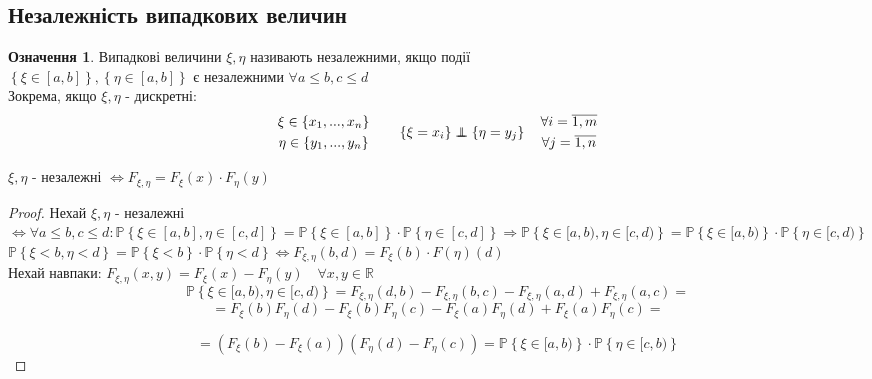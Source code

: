 \documentclass[fontsize=14pt,a4paper]{scrartcl}
\theoremstyle{definition}
\newtheorem*{defo}{Означення}
\theoremstyle{remark}
\theoremstyle{definition}
\theoremstyle{definition}
\newcommand\independent{\protect\mathpalette{\protect\independenT}{\perp}}
\def\independenT#1#2{\mathrel{\rlap{$#1#2$}\mkern2mu{#1#2}}}
\begin{document}
\subsection{Незалежність випадкових величин}
\begin{defo}
	Випадкові величини $\xi, \eta$ називають незалежними, якщо події \\$ \left\lbrace \xi\in [a,b] \right\rbrace, \left\lbrace \eta\in [a,b] \right\rbrace $ є незалежними $ \forall a \leq  b , c\leq d$\\
	Зокрема, якщо $\xi, \eta$ - дискретні:
	$$
	\begin{gathered}
	 \xi \in \left\lbrace x_1, ..., x_n \right\rbrace\\
	 \eta \in \left\lbrace y_1, ..., y_n  \right\rbrace
	\end{gathered} \qquad \left\lbrace \xi = x_i \right\rbrace \independent \left\lbrace \eta = y_j \right\rbrace \quad \begin{gathered}
	 \forall i = \overline{1, m}\\
	 \forall j = \overline{1, n}
	\end{gathered}
	$$

\end{defo}

\pagebreak

\begin{boxteo}
	$\xi, \eta$ - незалежні $\Leftrightarrow F_{\xi, \eta} = F_{\xi}(x) \cdot F_{\eta}(y)$
\end{boxteo}
\begin{proof}
Нехай $\xi, \eta$ - незалежні $\Leftrightarrow \forall a\leq b, c\leq d: \mathbb{P} \left\lbrace  \xi \in [a,b], \eta \in [c,d] \right\rbrace = \mathbb{P} \left\lbrace \xi\in[a,b] \right\rbrace \cdot \mathbb{P} \left\lbrace \eta\in[c,d] \right\rbrace \Rightarrow \mathbb{P} \left\lbrace  \xi\in [a,b), \eta \in [c,d) \right\rbrace = \mathbb{P} \left\lbrace \xi \in [a,b) \right\rbrace \cdot \mathbb{P} \left\lbrace \eta \in [c,d) \right\rbrace  $\\
$
\mathbb{P} \left\lbrace \xi<b, \eta <d  \right\rbrace = \mathbb{P} \left\lbrace \xi < b \right\rbrace \cdot \mathbb{P} \left\lbrace \eta <d \right\rbrace \Leftrightarrow F_{\xi, \eta} (b,d) = F_{\xi}(b) \cdot F(\eta)(d)
$\\
Нехай навпаки: $ F_{\xi, \eta } (x,y)  = F_{\xi}(x) - F_{\eta}(y)\quad \forall x,y \in \mathbb{R}$
$$
\mathbb{P} \left\lbrace  \xi\in [a,b), \eta \in [c,d)\right\rbrace = F_{\xi, \eta} (d,b) - F_{\xi,\eta}(b,c) - F_{\xi, \eta }(a,d) + F_{\xi, \eta}(a,c) =
$$
$$
= F_{\xi}(b) F_{\eta} (d) - F_{\xi}(b) F_{\eta}(c) - F_{\xi}(a) F_{\eta}(d) + F_{\xi}(a) F_{\eta}(c)  =$$


$$= \left( F_{\xi}(b) - F_{\xi}(a) \right) \left( F_{\eta}(d) - F_\eta (c) \right) = \mathbb{P} \left\lbrace \xi\in [a,b) \right\rbrace \cdot \mathbb{P} \left\lbrace \eta \in [c,b) \right\rbrace
$$

\end{proof}


\newpage

\end{document}
